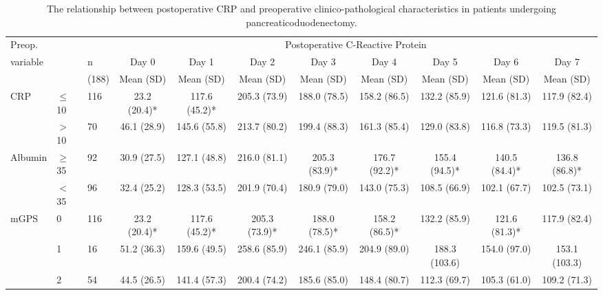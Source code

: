 \begin{sidewaystable}[p]
	\caption{The relationship  between postoperative CRP and preoperative clinico-pathological characteristics in patients undergoing pancreaticoduodenectomy. }
	\label{table:sirs_crp}
	\footnotesize
	\centering
	\renewcommand{\arraystretch}{1.2} %

	\begin{tabular}{|l ll | c c c c c c c c|}
		\hline
		Preop.              &           &       &                                    \multicolumn{8}{c|}{Postoperative C-Reactive Protein}                                     \\
		variable            &           & n     & Day 0        & Day 1         & Day 2         & Day 3         & Day 4         & Day 5         & Day 6         & Day 7         \\
		                    &           & (188) & Mean (SD)    & Mean (SD)     & Mean (SD)     & Mean (SD)     & Mean (SD)     & Mean (SD)     & Mean (SD)     & Mean (SD)     \\ \hline
		CRP                 & $\leq$10  & 116   & 23.2 (20.4)* & 117.6 (45.2)* & 205.3 (73.9)  & 188.0 (78.5)  & 158.2 (86.5)  & 132.2 (85.9)  & 121.6 (81.3)  & 117.9 (82.4)  \\
		                    & $>$10     & 70    & 46.1 (28.9)  & 145.6 (55.8)  & 213.7 (80.2)  & 199.4 (88.3)  & 161.3 (85.4)  & 129.0 (83.8)  & 116.8 (73.3)  & 119.5 (81.3)  \\
		Albumin             & $\geq$35  & 92    & 30.9 (27.5)  & 127.1 (48.8)  & 216.0 (81.1)  & 205.3 (83.9)* & 176.7 (92.2)* & 155.4 (94.5)* & 140.5 (84.4)* & 136.8 (86.8)* \\
		                    & $<$35     & 96    & 32.4 (25.2)  & 128.3 (53.5)  & 201.9 (70.4)  & 180.9 (79.0)  & 143.0 (75.3)  & 108.5 (66.9)  & 102.1 (67.7)  & 102.5 (73.1)  \\
		mGPS                & 0         & 116   & 23.2 (20.4)* & 117.6 (45.2)* & 205.3 (73.9)* & 188.0 (78.5)* & 158.2 (86.5)* & 132.2 (85.9)  & 121.6 (81.3)* & 117.9 (82.4)  \\
		                    & 1         & 16    & 51.2 (36.3)  & 159.6 (49.5)  & 258.6 (85.9)  & 246.1 (85.9)  & 204.9 (89.0)  & 188.3 (103.6) & 154.0 (97.0)  & 153.1 (103.3) \\
		                    & 2         & 54    & 44.5 (26.5)  & 141.4 (57.3)  & 200.4 (74.2)  & 185.6 (85.0)  & 148.4 (80.7)  & 112.3 (69.7)  & 105.3 (61.0)  & 109.2 (71.3)  \\

\end{tabular}
\end{sidewaystable}
